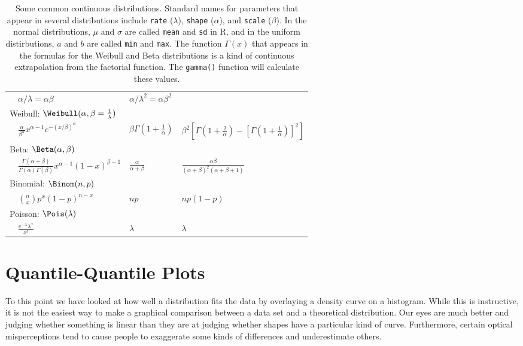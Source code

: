 \documentclass[twoside]{book}\usepackage[]{graphicx}\usepackage[]{xcolor}
\def\myindex#1{\index{#1}}
\def\R{{\sf R}}
\begin{document}
\begin{table}
\begin{center}
\begin{tabular}{|p{5mm}p{40mm}p{25mm}p{45mm}|}
  	& $\alpha/\lambda = \alpha \beta$ 
	& $\alpha/\lambda^2 = \alpha \beta^2$
\\[4.2mm]
\multicolumn{2}{|l}{Weibull: $\Weibull(\alpha,\beta = \frac{1}{\lambda})$} && \\
&
	  $\displaystyle \frac{\alpha}{\beta^\alpha} x^{\alpha-1} e^{-(x/\beta)^\alpha}$
	& 
	  $\beta \Gamma(1 + \frac1{\alpha})$
	&
	  $\beta^2 \left[ \Gamma(1 + \frac{2}{\alpha}) 
	  - \left[ \Gamma(1 + \frac{1}{\alpha}) \right]^2 \right]
	  $ 
\\[4.0mm]
\multicolumn{2}{|l}{  Beta: $\Beta(\alpha, \beta)$ } && \\
	& 
  $\frac{\Gamma(\alpha+\beta)}{\Gamma(\alpha)\Gamma(\beta)} 
		x^{\alpha-1}(1-x)^{\beta-1}$
  	& 
	  $\displaystyle \frac{\alpha}{\alpha + \beta}$
	  &
	  $\displaystyle \frac{\alpha \beta }{(\alpha + \beta)^2(\alpha + \beta + 1)}$
\\[4mm]
\hline
\multicolumn{2}{|l}{  Binomial: $\Binom(n, p)$ } && \\
	& 
	$\displaystyle \binom{n}{x} p^x (1-p)^{n-x}$
	&
	$np$
	&
	$np(1-p)$
\\[4mm]
\multicolumn{2}{|l}{  Poisson: $\Pois(\lambda)$ } && \\
	& 
	$\displaystyle \frac{e^{-\lambda} \lambda^x} {x!}$
	&
	$\lambda$
	&
	$\lambda$
\\[4mm]
\hline
\end{tabular}
\end{center}
\caption{Some common continuous distributions.
Standard names for parameters that appear in several distributions
include \texttt{rate} ($\lambda$), \texttt{shape} ($\alpha$), and \texttt{scale} ($\beta$).
In the normal distributions, $\mu$ and $\sigma$ are called \texttt{mean} and \texttt{sd}
in \R, and in the uniform distirbutions, $a$ and $b$ are called \texttt{min} and \texttt{max}.
The function $\Gamma(x)$ that appears in the formulas for the Weibull and Beta
distributions is a kind of continuous extrapolation from the factorial function.
The \texttt{gamma()} function will calculate these values.}
\label{table:contDist}
\end{table}


\section{Quantile-Quantile Plots}

\myindex{quantile-quantile plot}%
To this point we have looked at how well a distribution fits the data by overlaying a density
curve on a histogram.  While this is instructive, it is not the easiest way to make a 
graphical comparison between a data set and a theoretical distribution.   Our eyes
are much better and judging whether something is linear than they are at judging whether 
shapes have a particular kind of curve.  Furthermore, certain optical misperceptions
tend to cause people to exaggerate some kinds of differences and underestimate others.
\end{document}
